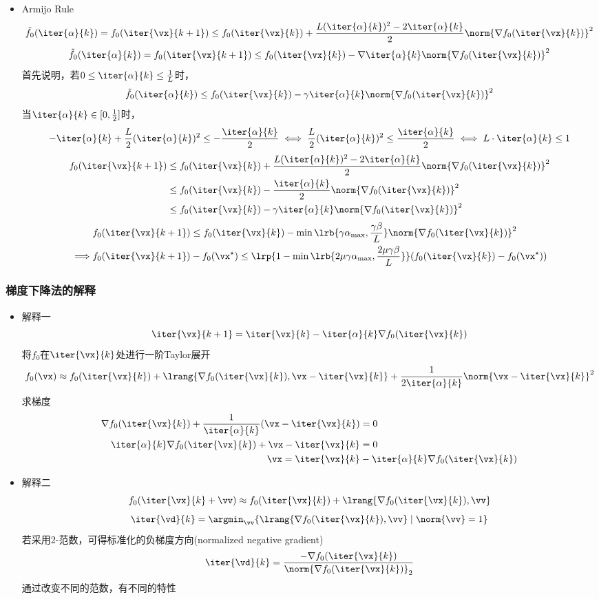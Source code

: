 \begin{itemize}
\item Armijo Rule
\[\tilde{f}_0(\iter{\alpha}{k})=f_0(\iter{\vx}{k+1})\leq f_0(\iter{\vx}{k})+\frac{L(\iter{\alpha}{k})^2-2\iter{\alpha}{k}}{2}\norm{\nabla f_0(\iter{\vx}{k})}^2\]
\[\tilde{f}_0(\iter{\alpha}{k})=f_0(\iter{\vx}{k+1})\leq f_0(\iter{\vx}{k})-\nabla\iter{\alpha}{k}\norm{\nabla f_0(\iter{\vx}{k})}^2\]
首先说明，若$0\leq\iter{\alpha}{k}\leq\frac{1}{L}$时，
\[\tilde{f}_0(\iter{\alpha}{k})\leq f_0(\iter{\vx}{k})-\gamma\iter{\alpha}{k}\norm{\nabla f_0(\iter{\vx}{k})}^2\]
当$\iter{\alpha}{k}\in[0,\frac{1}{2}]$时，
\[-\iter{\alpha}{k}+\frac{L}{2}(\iter{\alpha}{k})^2\leq -\frac{\iter{\alpha}{k}}{2}\iff \frac{L}{2}(\iter{\alpha}{k})^2\leq\frac{\iter{\alpha}{k}}{2}\iff L\cdot\iter{\alpha}{k}\leq 1\]
\[\begin{aligned}
    f_0(\iter{\vx}{k+1})&\leq f_0(\iter{\vx}{k})+\frac{L(\iter{\alpha}{k})^2-2\iter{\alpha}{k}}{2}\norm{\nabla f_0(\iter{\vx}{k})}^2\\
    &\leq f_0(\iter{\vx}{k})-\frac{\iter{\alpha}{k}}{2}\norm{\nabla f_0(\iter{\vx}{k})}^2\\
    &\leq f_0(\iter{\vx}{k})-\gamma\iter{\alpha}{k}\norm{\nabla f_0(\iter{\vx}{k})}^2
\end{aligned}\]
\[\begin{aligned}
    &f_0(\iter{\vx}{k+1})\leq f_0(\iter{\vx}{k})-\min\lrb{\gamma\alpha_{\max},\frac{\gamma\beta}{L}}\norm{\nabla f_0(\iter{\vx}{k})}^2\\
    \implies& f_0(\iter{\vx}{k+1})-f_0(\vx^\star)\leq\lrp{1-\min\lrb{2\mu\gamma\alpha_{\max},\frac{2\mu\gamma\beta}{L}}}(f_0(\iter{\vx}{k})-f_0(\vx^\star))
\end{aligned}\]
\end{itemize}

\subsubsection{梯度下降法的解释}
\begin{itemize}
\item 解释一
\[\iter{\vx}{k+1}=\iter{\vx}{k}-\iter{\alpha}{k}\nabla f_0(\iter{\vx}{k})\]
将$f_0$在$\iter{\vx}{k}$处进行一阶Taylor展开
\[f_0(\vx)\approx f_0(\iter{\vx}{k})+\lrang{\nabla f_0(\iter{\vx}{k}),\vx-\iter{\vx}{k}}+\frac{1}{2\iter{\alpha}{k}}\norm{\vx-\iter{\vx}{k}}^2\]
求梯度
\[\begin{aligned}
    \nabla f_0(\iter{\vx}{k})+\frac{1}{\iter{\alpha}{k}}(\vx-\iter{\vx}{k})&=0\\
    \iter{\alpha}{k}\nabla f_0(\iter{\vx}{k})+\vx-\iter{\vx}{k}&=0\\
    \vx=\iter{\vx}{k}&-\iter{\alpha}{k}\nabla f_0(\iter{\vx}{k})
\end{aligned}\]

\item 解释二
\[f_0(\iter{\vx}{k}+\vv)\approx f_0(\iter{\vx}{k})+\lrang{\nabla f_0(\iter{\vx}{k}),\vv}\]
\[\iter{\vd}{k}=\argmin_\vv\{\lrang{\nabla f_0(\iter{\vx}{k}),\vv}\mid \norm{\vv}=1\}\]
若采用2-范数，可得标准化的负梯度方向(normalized negative gradient)
\[\iter{\vd}{k}=\frac{-\nabla f_0(\iter{\vx}{k})}{\norm{\nabla f_0(\iter{\vx}{k})}_2}\]
通过改变不同的范数，有不同的特性
\end{itemize}

